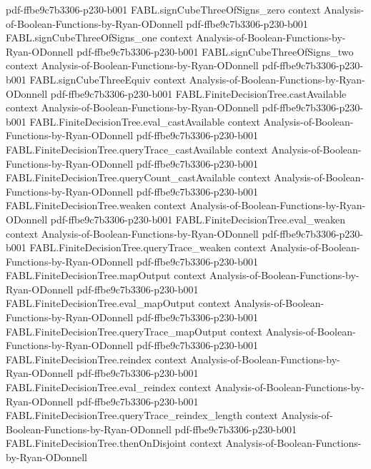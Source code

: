 \begin{theorem}
  {pdf-ffbe9c7b3306-p230-b001}
\proofstep
  {FABL.signCubeThreeOfSigns_zero}
  {context}
  {Analysis-of-Boolean-Functions-by-Ryan-ODonnell}
  {pdf-ffbe9c7b3306-p230-b001}
\proofstep
  {FABL.signCubeThreeOfSigns_one}
  {context}
  {Analysis-of-Boolean-Functions-by-Ryan-ODonnell}
  {pdf-ffbe9c7b3306-p230-b001}
\proofstep
  {FABL.signCubeThreeOfSigns_two}
  {context}
  {Analysis-of-Boolean-Functions-by-Ryan-ODonnell}
  {pdf-ffbe9c7b3306-p230-b001}
\proofstep
  {FABL.signCubeThreeEquiv}
  {context}
  {Analysis-of-Boolean-Functions-by-Ryan-ODonnell}
  {pdf-ffbe9c7b3306-p230-b001}
\proofstep
  {FABL.FiniteDecisionTree.castAvailable}
  {context}
  {Analysis-of-Boolean-Functions-by-Ryan-ODonnell}
  {pdf-ffbe9c7b3306-p230-b001}
\proofstep
  {FABL.FiniteDecisionTree.eval_castAvailable}
  {context}
  {Analysis-of-Boolean-Functions-by-Ryan-ODonnell}
  {pdf-ffbe9c7b3306-p230-b001}
\proofstep
  {FABL.FiniteDecisionTree.queryTrace_castAvailable}
  {context}
  {Analysis-of-Boolean-Functions-by-Ryan-ODonnell}
  {pdf-ffbe9c7b3306-p230-b001}
\proofstep
  {FABL.FiniteDecisionTree.queryCount_castAvailable}
  {context}
  {Analysis-of-Boolean-Functions-by-Ryan-ODonnell}
  {pdf-ffbe9c7b3306-p230-b001}
\proofstep
  {FABL.FiniteDecisionTree.weaken}
  {context}
  {Analysis-of-Boolean-Functions-by-Ryan-ODonnell}
  {pdf-ffbe9c7b3306-p230-b001}
\proofstep
  {FABL.FiniteDecisionTree.eval_weaken}
  {context}
  {Analysis-of-Boolean-Functions-by-Ryan-ODonnell}
  {pdf-ffbe9c7b3306-p230-b001}
\proofstep
  {FABL.FiniteDecisionTree.queryTrace_weaken}
  {context}
  {Analysis-of-Boolean-Functions-by-Ryan-ODonnell}
  {pdf-ffbe9c7b3306-p230-b001}
\proofstep
  {FABL.FiniteDecisionTree.mapOutput}
  {context}
  {Analysis-of-Boolean-Functions-by-Ryan-ODonnell}
  {pdf-ffbe9c7b3306-p230-b001}
\proofstep
  {FABL.FiniteDecisionTree.eval_mapOutput}
  {context}
  {Analysis-of-Boolean-Functions-by-Ryan-ODonnell}
  {pdf-ffbe9c7b3306-p230-b001}
\proofstep
  {FABL.FiniteDecisionTree.queryTrace_mapOutput}
  {context}
  {Analysis-of-Boolean-Functions-by-Ryan-ODonnell}
  {pdf-ffbe9c7b3306-p230-b001}
\proofstep
  {FABL.FiniteDecisionTree.reindex}
  {context}
  {Analysis-of-Boolean-Functions-by-Ryan-ODonnell}
  {pdf-ffbe9c7b3306-p230-b001}
\proofstep
  {FABL.FiniteDecisionTree.eval_reindex}
  {context}
  {Analysis-of-Boolean-Functions-by-Ryan-ODonnell}
  {pdf-ffbe9c7b3306-p230-b001}
\proofstep
  {FABL.FiniteDecisionTree.queryTrace_reindex_length}
  {context}
  {Analysis-of-Boolean-Functions-by-Ryan-ODonnell}
  {pdf-ffbe9c7b3306-p230-b001}
\proofstep
  {FABL.FiniteDecisionTree.thenOnDisjoint}
  {context}
  {Analysis-of-Boolean-Functions-by-Ryan-ODonnell}

\end{theorem}
